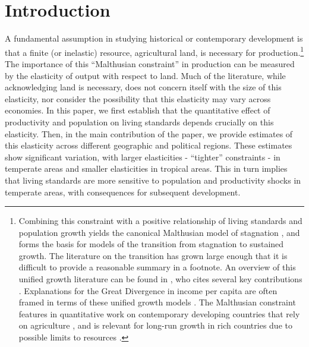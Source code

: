 \documentclass[11pt]{article}
\begin{document}
\pagebreak 

\section{Introduction}
\onehalfspacing 
A fundamental assumption in studying historical or contemporary development is that a finite (or inelastic) resource, agricultural land, is necessary for production.\footnote{Combining this constraint with a positive relationship of living standards and population growth yields the canonical Malthusian model of stagnation \citep{ashraf2010dynamics}, and forms the basis for models of the transition from stagnation to sustained growth. The literature on the transition has grown large enough that it is difficult to provide a reasonable summary in a footnote. An overview of this unified growth literature can be found in \citet{Galor:2011uq}, who cites several key contributions \citep{gw00,galor2002natural,Hansen:2002fk,doepke2004accounting,cs2005,lagerlof2006,craftsmills2009,strulik2008population}. Explanations for the Great Divergence in income per capita are often framed in terms of these unified growth models \citep{kp2001,galor2008trading,vollrath2011,vv08,vv13,cs2015}. The Malthusian constraint features in quantitative work on contemporary developing countries that rely on agriculture \citep{Gollin:2007oq,Restuccia:2008hc,weilwilde2009,Gollin:2010ys,ev2016clim}, and is relevant for long-run growth in rich countries due to possible limits to resources \citep{perettovalente2015}.} The importance of this ``Malthusian constraint'' in production can be measured by the elasticity of output with respect to land. Much of the literature, while acknowledging land is necessary, does not concern itself with the size of this elasticity, nor consider the possibility that this elasticity may vary across economies. In this paper, we first establish that the quantitative effect of productivity and population on living standards depends crucially on this elasticity. Then, in the main contribution of the paper, we provide estimates of this elasticity across different geographic and political regions. These estimates show significant variation, with larger elasticities - ``tighter'' constraints - in temperate areas and smaller elasticities in tropical areas. This in turn implies that living standards are more sensitive to population and productivity shocks in temperate areas, with consequences for subsequent development. 
\end{document}
